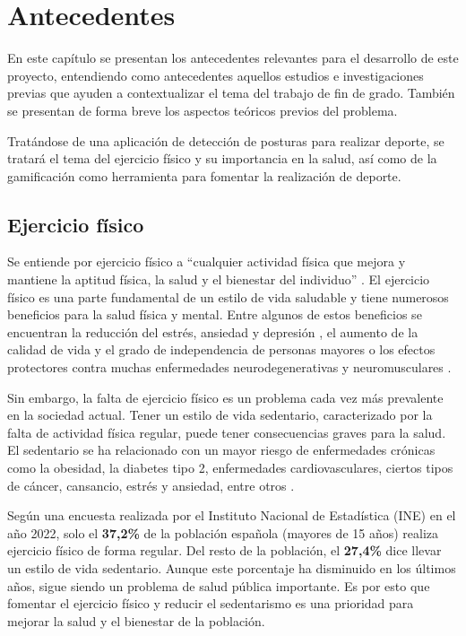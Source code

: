 \chapter{Antecedentes}
\label{cap:antecedentes}
En este capítulo se presentan los antecedentes relevantes para el desarrollo de
este proyecto, entendiendo como antecedentes aquellos estudios e investigaciones
previas que ayuden a contextualizar el tema del trabajo de fin de grado. También
se presentan de forma breve los aspectos teóricos previos del problema.

Tratándose de una aplicación de detección de posturas para realizar deporte, se
tratará el tema del ejercicio físico y su importancia en la salud, así como de
la gamificación como herramienta para fomentar la realización de deporte.

\section{Ejercicio físico}
\label{sec:ejercicio-fisico}
Se entiende por ejercicio físico a \enquote{cualquier actividad física que
mejora y mantiene la aptitud física, la salud y el bienestar del individuo}
\parencite{WikipediaEjercicioFisico}. El ejercicio físico es una parte
fundamental de un estilo de vida saludable y tiene numerosos beneficios para la
salud física y mental. Entre algunos de estos beneficios se encuentran la
reducción del estrés, ansiedad y depresión
\parencites{Guterman2023Jul}{marquez1995beneficios}, el aumento de la calidad de
vida y el grado de independencia de personas mayores
\parencite{Morel2009EjercicioAdultoMayor} o los efectos protectores contra
muchas enfermedades neurodegenerativas y neuromusculares
\parencite{grondard2005regular}.

Sin embargo, la falta de ejercicio físico es un problema cada vez más prevalente
en la sociedad actual. Tener un estilo de vida sedentario, caracterizado por la
falta de actividad física regular, puede tener consecuencias graves para la
salud. El sedentario se ha relacionado con un mayor riesgo de enfermedades
crónicas como la obesidad, la diabetes tipo 2, enfermedades cardiovasculares,
ciertos tipos de cáncer, cansancio, estrés y ansiedad, entre otros
\parencite{GarcíaMatamoros_2019}.

Según una encuesta realizada por el Instituto Nacional de Estadística (INE) en
el año 2022, solo el \textbf{37,2\%} de la población española (mayores de 15
años) realiza ejercicio físico de forma regular. Del resto de la población, el
\textbf{27,4\%} dice llevar un estilo de vida sedentario.  Aunque este
porcentaje ha disminuido en los últimos años, sigue siendo un problema de salud
pública importante. Es por esto que fomentar el ejercicio físico y reducir el
sedentarismo es una prioridad para mejorar la salud y el bienestar de la
población.

